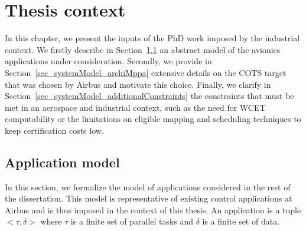 \documentclass[main.tex]{subfiles}
\begin{document}
\chapter{Thesis context}
\thispagestyle{chapstyle}
\label{chap_systemModel}
\minitoc


In this chapter, we present the inputs of the PhD work imposed by the
industrial context. We firstly describe in
Section~\ref{sec_systemModel_appModel} an abstract model of the avionics
applications under consideration. Secondly, we provide in
Section~\ref{sec_systemModel_archiMppa} extensive details on the COTS target
that was chosen by Airbus and motivate this choice. Finally, we clarify in
Section~\ref{sec_systemModel_additionalConstraints} the constraints that must
be met in an aerospace and industrial context, such as the need for WCET
computability or the limitations on eligible mapping and scheduling techniques
to keep certification costs low.


\section{Application model}
\label{sec_systemModel_appModel}

In this section, we formalize the model of applications considered in the rest
of the dissertation. This model is representative of existing control
applications at Airbus and is thus imposed in the context of this thesis.  An
application is a tuple $< \tau , \delta >$ where $\tau$ is a finite set of
parallel tasks and $\delta$ is a finite set of data. 
\end{document}
